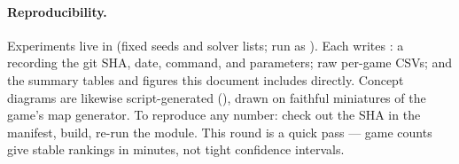 \paragraph{Reproducibility.} Experiments live in
 (fixed seeds and solver lists; run as
). Each writes
: a  recording the git SHA, date,
command, and parameters; raw per-game CSVs; and the summary tables and
figures this document includes directly. Concept diagrams are likewise
script-generated (), drawn on faithful miniatures of
the game's map generator. To reproduce any number: check out the SHA in the
manifest, build, re-run the module. This round is a quick pass --- game
counts give stable rankings in minutes, not tight confidence intervals.
